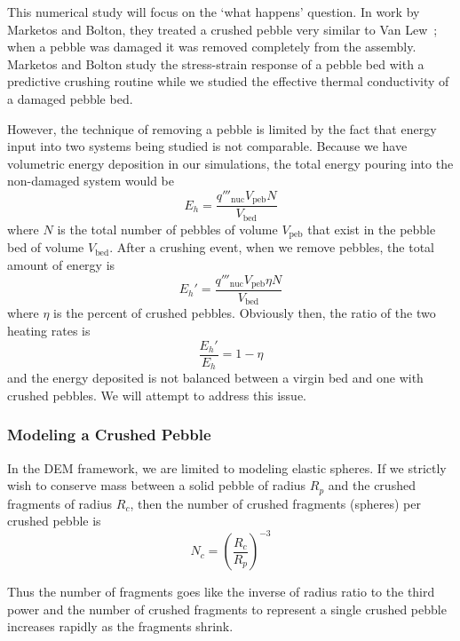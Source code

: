 This numerical study will focus on the `what happens' question. In work by Marketos and Bolton, they treated a crushed pebble very similar to Van Lew\etal~; when a pebble was damaged it was removed completely from the assembly.\cite{Marketos2007,VanLew2014} Marketos and Bolton study the stress-strain response of a pebble bed with a predictive crushing routine while we studied the effective thermal conductivity of a damaged pebble bed.

However, the technique of removing a pebble is limited by the fact that energy input into two systems being studied is not comparable. Because we have volumetric energy deposition in our simulations, the total energy pouring into the non-damaged system would be
\begin{equation}
	E_h = \frac{q'''_\text{nuc} V_\text{peb} N}{V_\text{bed}}
\end{equation}
where $N$ is the total number of pebbles of volume $V_\text{peb}$ that exist in the pebble bed of volume $V_\text{bed}$. After a crushing event, when we remove pebbles, the total amount of energy is
\begin{equation}
	E_h' = \frac{q'''_\text{nuc} V_\text{peb} \eta N}{V_\text{bed}}
\end{equation}
where $\eta$ is the percent of crushed pebbles. Obviously then, the ratio of the two heating rates is\begin{equation}
	\frac{E_h'}{E_h} = 1 - \eta
\end{equation}
and the energy deposited is not balanced between a virgin bed and one with crushed pebbles. We will attempt to address this issue.

\subsubsection{Modeling a Crushed Pebble}
In the DEM framework, we are limited to modeling elastic spheres. If we strictly wish to conserve mass between a solid pebble of radius $R_p$ and the crushed fragments of radius $R_c$, then the number of crushed fragments (spheres) per crushed pebble is
\begin{equation}\label{eq:nc-crushed-fragments}
	N_c = \left(\frac{R_c}{R_p}\right)^{-3}
\end{equation}

Thus the number of fragments goes like the inverse of radius ratio to the third power and the number of crushed fragments to represent a single crushed pebble increases rapidly as the fragments shrink.



